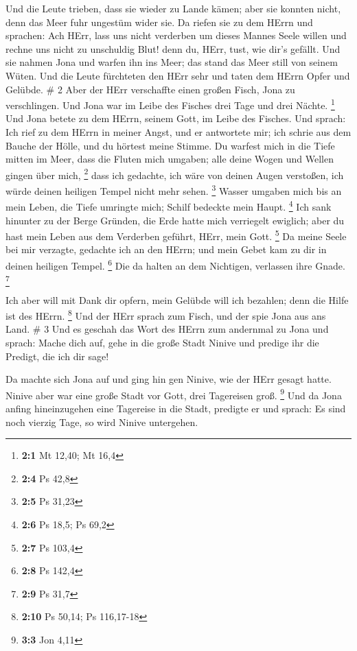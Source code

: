  Und die Leute trieben, dass sie wieder zu Lande kämen;
aber sie konnten nicht, denn das Meer fuhr ungestüm wider sie.
 Da riefen sie zu dem HErrn und sprachen: Ach HErr, lass
uns nicht verderben um dieses Mannes Seele willen und rechne uns nicht
zu unschuldig Blut! denn du, HErr, tust, wie dir's gefällt.
 Und sie nahmen Jona und warfen ihn ins Meer; das stand das
Meer still von seinem Wüten.  Und die Leute fürchteten den
HErr sehr und taten dem HErrn Opfer und Gelübde. \# 2  Aber
der HErr verschaffte einen großen Fisch, Jona zu verschlingen. Und Jona
war im Leibe des Fisches drei Tage und drei Nächte. \footnote{\textbf{2:1}
  Mt 12,40; Mt 16,4}  Und Jona betete zu dem HErrn, seinem
Gott, im Leibe des Fisches.  Und sprach: Ich rief zu dem
HErrn in meiner Angst, und er antwortete mir; ich schrie aus dem Bauche
der Hölle, und du hörtest meine Stimme.  Du warfest mich in
die Tiefe mitten im Meer, dass die Fluten mich umgaben; alle deine Wogen
und Wellen gingen über mich, \footnote{\textbf{2:4} Ps 42,8}
 dass ich gedachte, ich wäre von deinen Augen verstoßen, ich
würde deinen heiligen Tempel nicht mehr sehen. \footnote{\textbf{2:5} Ps
  31,23}  Wasser umgaben mich bis an mein Leben, die Tiefe
umringte mich; Schilf bedeckte mein Haupt. \footnote{\textbf{2:6} Ps
  18,5; Ps 69,2}  Ich sank hinunter zu der Berge Gründen,
die Erde hatte mich verriegelt ewiglich; aber du hast mein Leben aus dem
Verderben geführt, HErr, mein Gott. \footnote{\textbf{2:7} Ps 103,4}
 Da meine Seele bei mir verzagte, gedachte ich an den HErrn;
und mein Gebet kam zu dir in deinen heiligen Tempel. \footnote{\textbf{2:8}
  Ps 142,4}  Die da halten an dem Nichtigen, verlassen ihre
Gnade. \footnote{\textbf{2:9} Ps 31,7}

 Ich aber will mit Dank dir opfern, mein Gelübde will ich
bezahlen; denn die Hilfe ist des HErrn. \footnote{\textbf{2:10} Ps
  50,14; Ps 116,17-18}  Und der HErr sprach zum Fisch, und
der spie Jona aus ans Land. \# 3  Und es geschah das Wort
des HErrn zum andernmal zu Jona und sprach:  Mache dich auf,
gehe in die große Stadt Ninive und predige ihr die Predigt, die ich dir
sage!

 Da machte sich Jona auf und ging hin gen Ninive, wie der
HErr gesagt hatte. Ninive aber war eine große Stadt vor Gott, drei
Tagereisen groß. \footnote{\textbf{3:3} Jon 4,11}  Und da
Jona anfing hineinzugehen eine Tagereise in die Stadt, predigte er und
sprach: Es sind noch vierzig Tage, so wird Ninive untergehen.

